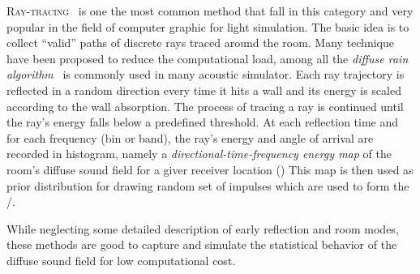 \textsc{Ray-tracing}~ is one the most common method that fall in this category and very popular
in the field of computer graphic for light simulation.
The basic idea is to collect ``valid'' paths of discrete rays traced around the room.
Many technique have been proposed to reduce the computational load, among all the \textit{diffuse rain algorithm}~
is commonly used in many acoustic simulator.
Each ray trajectory is reflected in a random direction every time it hits a wall and its energy is scaled according to the wall absorption.
The process of tracing a ray is continued until the ray’s energy falls below a predefined threshold.
At each reflection time and for each frequency (bin or band), the ray's energy and angle of arrival are recorded in histogram,
namely a \textit{directional-time-frequency energy map} of the room’s diffuse sound field for a giver receiver location ()
This map is then used as prior distribution for drawing random set of impulses which are used to form the \RIR/.

While neglecting some detailed description of early reflection and room modes,
these methods are good to capture and simulate the statistical behavior of the diffuse sound field for low computational cost.



